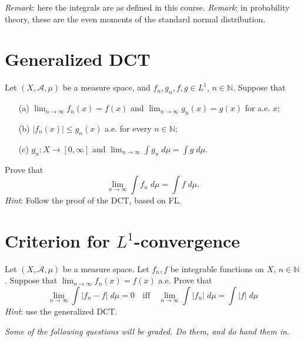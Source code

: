\documentclass[lang=cn,11pt]{elegantbook}
\begin{document}
    \textit{Remark}: here the integrals are as defined in this course.
    \textit{Remark}: in probability theory, these are the even moments of the standard normal distribution.

\section{Generalized DCT}
  Let $(X, \mathcal{A}, \mu)$ be a measure space, and $f_n, g_n, f, g\in L^1$, $n\in \mathbb{N}$. Suppose that 
  \begin{itemize}
  \item[(a)]$\lim_{n\to\infty} f_n(x)=f(x)$ and $ \lim_{n\to\infty} g_n(x)=g(x)$ for a.e. $x$;
  \item[(b)] $|f_n(x)|\le g_n(x)$ a.e. for every $n\in \mathbb{N}$;
  \item[(c)]$g_n\colon X\to [0, \infty]$ and $\lim_{n\to \infty} \int g_n \; d \mu = \int g\; d\mu$.
  \end{itemize}
  Prove that
  \[
    \lim_{n\to \infty} \int f_n \; d\mu = \int f \; d\mu.
  \]
\textit{Hint}: Follow the proof of the DCT, based on FL.



\section{Criterion for $L^1$-convergence}
  Let $(X, \mathcal{A}, \mu)$ be a measure space. 
  Let $f_n, f$ be integrable functions on $X$, $n\in \mathbb{N}$. 
  Suppose that $\lim_{n\to\infty} f_n(x)=f(x)$ a.e. Prove that \[
    \lim_{n\to\infty} \int |f_n-f| \; d\mu =0\quad\text{iff}
    \quad \lim_{n\to \infty} \int |f_n| \; d\mu = \int |f|\; d\mu\]
  \textit{Hint}: use the generalized DCT.






  
\vspace*{10mm}
\newpage
\begin{center}
\textit{Some of the following questions will be graded. Do them, and do hand them in}.
\end{center}
\end{document}
